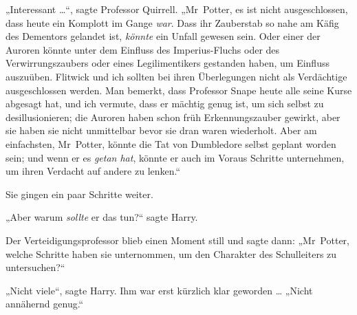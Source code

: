 „Interessant …“, sagte Professor Quirrell.
„Mr~Potter, es ist nicht ausgeschlossen, dass heute ein Komplott im Gange \emph{war}. Dass ihr Zauberstab so nahe am Käfig des Dementors gelandet ist, \emph{könnte} ein Unfall gewesen sein. Oder einer der Auroren könnte unter dem Einfluss des Imperius-Fluchs oder des Verwirrungszaubers oder eines Legilimentikers gestanden haben, um Einfluss auszuüben. Flitwick und ich sollten bei ihren Überlegungen nicht als Verdächtige ausgeschlossen werden. Man bemerkt, dass Professor Snape heute alle seine Kurse abgesagt hat, und ich vermute, dass er mächtig genug ist, um sich selbst zu desillusionieren; die Auroren haben schon früh Erkennungszauber gewirkt, aber sie haben sie nicht unmittelbar bevor sie dran waren wiederholt. Aber am einfachsten, Mr~Potter, könnte die Tat von Dumbledore selbst geplant worden sein; und wenn er es \emph{getan hat}, könnte er auch im Voraus Schritte unternehmen, um ihren Verdacht auf andere zu lenken.“

Sie gingen ein paar Schritte weiter.

„Aber warum \emph{sollte} er das tun?“ sagte Harry.

Der Verteidigungsprofessor blieb einen Moment still und sagte dann:
„Mr~Potter, welche Schritte haben sie unternommen, um den Charakter des Schulleiters zu untersuchen?“

„Nicht viele“, sagte Harry. Ihm war erst kürzlich klar geworden …
„Nicht annähernd genug.“

